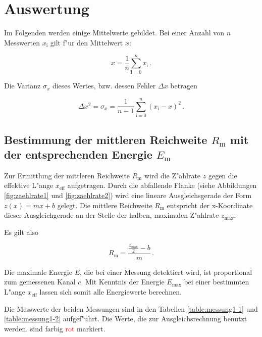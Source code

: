 \section{Auswertung}
\label{sec:auswertung}
	Im Folgenden werden einige Mittelwerte gebildet.
	Bei einer Anzahl von $n$ Messwerten $x_\mathrm{i}$ gilt f"ur den Mittelwert $x$:

	\begin{equation*}
		x = \frac{1}{n} \sum_{\mathrm{i} = 0}^n {x_\mathrm{i}} \,.
	\end{equation*}

	Die Varianz $\sigma_x$ dieses Wertes, bzw. dessen Fehler $\Delta x$ betragen

	\begin{equation*}
		\Delta x^2 = \sigma_x = \frac{1}{n - 1} \sum_{\mathrm{i} = 0}^n{\left(x_\mathrm{i} - x\right)^2} \,.
	\end{equation*}

	\subsection{Bestimmung der mittleren Reichweite $R_\mathrm{m}$ mit der entsprechenden Energie $E_\mathrm{m}$}
	\label{subsec:mittlere_reichweite}
		Zur Ermittlung der mittleren Reichweite $R_\mathrm{m}$ wird die Z"ahlrate $z$ gegen die effektive L"ange $x_\mathrm{eff}$ aufgetragen.
		Durch die abfallende Flanke (siehe Abbildungen \ref{fig:zaehlrate1} und \ref{fig:zaehlrate2}) wird eine lineare Ausgleichsgerade der Form $z(x) = mx + b$ gelegt.
		Die mittlere Reichweite $R_\mathrm{m}$ entspricht der x-Koordinate dieser Ausgleichgerade an der Stelle der halben, maximalen Z"ahlrate $z_\mathrm{max}$.

		Es gilt also

		\begin{equation*}
			R_\mathrm{m} = \frac{\frac{z_\mathrm{max}}{2} - b}{m} \,.
		\end{equation*}

		Die maximale Energie $E$, die bei einer Messung detektiert wird, ist proportional zum gemessenen Kanal $c$.
		Mit Kenntnis der Energie $E_\mathrm{max}$ bei einer bestimmten L"ange $x_\mathrm{eff}$ lassen sich somit alle Energiewerte berechnen.

		Die Messwerte der beiden Messungen sind in den Tabellen \ref{table:messung1-1} und \ref{table:messung1-2} aufgef"uhrt.
		Die Werte, die zur Ausgleichsrechnung benutzt werden, sind farbig \textcolor{red}{rot} markiert.

